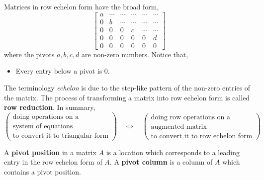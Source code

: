 \documentclass[letterpaper,12pt]{article}
\begin{document}
Matrices in row echelon form have the broad form,
\begin{equation*}
    \begin{bmatrix} a & \cdots & \cdots & \cdots & \cdots & \cdots \\
    0 & b & \cdots & \cdots & \cdots & \cdots \\
    0 & 0 & 0 & c & \cdots & \cdots \\
    0 & 0 & 0 & 0 & 0 & d \\
    0 & 0 & 0 & 0 & 0 & 0 \end{bmatrix}
\end{equation*}
where the pivots $a, b, c, d$ are non-zero numbers. Notice that,
\begin{itemize}
    \item Every entry below a pivot is 0.
\end{itemize}

The terminology \textit{echelon} is due to the step-like pattern of the non-zero entries of the matrix. The process of transforming a matrix into row echelon form is called \textbf{row reduction}. In summary,
\begin{equation*}
    \begin{pmatrix} \text{doing operations on a} \\ \text{system of equations} \\ \text{to convert it to triangular form} \end{pmatrix} \quad \iff \quad \begin{pmatrix} \text{doing row operations on a} \\ \text{augmented matrix} \\ \text{to convert it to row echelon form} \end{pmatrix}
\end{equation*}

\begin{definition}
A \textbf{pivot position} in a matrix $A$ is a location which corresponds to a leading entry in the row echelon form of $A$. A \textbf{pivot column} is a column of $A$ which contains a pivot position.
\end{definition}
\end{document}
